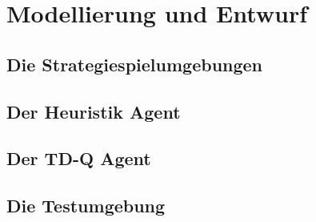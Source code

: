 \chapter{Modellierung und Entwurf}
\label{cha:Modellierung und Entwurf}

\section{Die Strategiespielumgebungen}

\section{Der Heuristik Agent}

\section{Der TD-Q Agent}

\section{Die Testumgebung}

